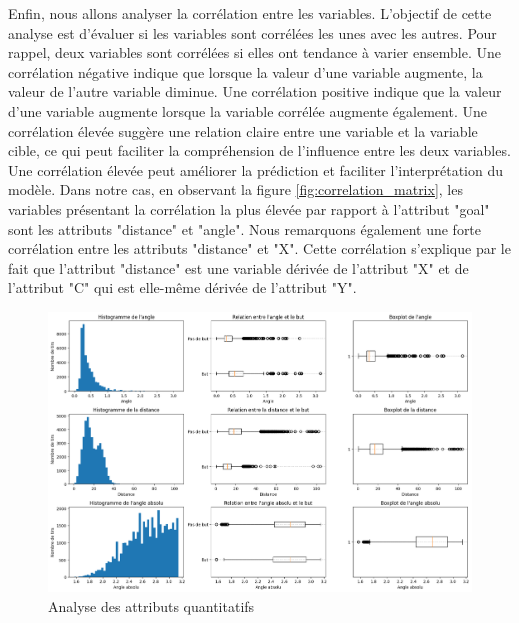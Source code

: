 \documentclass[12pt]{article}
\begin{document}
Enfin, nous allons analyser la corrélation entre les variables.
L'objectif de cette analyse est d'évaluer si les variables sont corrélées les unes avec les autres.
Pour rappel, deux variables sont corrélées si elles ont tendance à varier ensemble. 
Une corrélation négative indique que lorsque la valeur d'une variable augmente, la valeur de l'autre variable diminue. 
Une corrélation positive indique que la valeur d'une variable augmente lorsque la variable corrélée augmente également.
Une corrélation élevée suggère une relation claire entre une variable et la variable cible, ce qui peut faciliter la compréhension de l'influence entre les deux variables.
Une corrélation élevée peut améliorer la prédiction et faciliter l'interprétation du modèle. 
\newline\newline
Dans notre cas, en observant la figure \ref{fig:correlation_matrix}, les variables présentant la corrélation la plus élevée par rapport à l'attribut "goal" sont les attributs "distance" et "angle". 
Nous remarquons également une forte corrélation entre les attributs "distance" et "X". 
Cette corrélation s'explique par le fait que l'attribut "distance" est une variable dérivée de l'attribut "X" et de l'attribut "C" qui est elle-même dérivée de l'attribut "Y".
\begin{figure}[htp]
    \centering
    \includegraphics[width=\textwidth]{img/analyseOutlier.png}
    \caption{Analyse des attributs quantitatifs}
    \label{fig:analyse_quantitative}
\end{figure}
\end{document}

